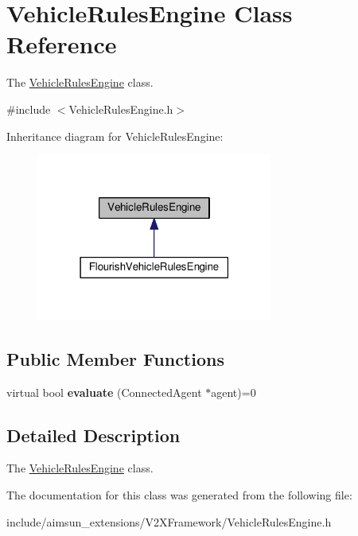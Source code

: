 \hypertarget{classVehicleRulesEngine}{}\section{Vehicle\+Rules\+Engine Class Reference}
\label{classVehicleRulesEngine}


The \hyperlink{classVehicleRulesEngine}{Vehicle\+Rules\+Engine} class.  




{\ttfamily \#include $<$Vehicle\+Rules\+Engine.\+h$>$}



Inheritance diagram for Vehicle\+Rules\+Engine\+:\nopagebreak
\begin{figure}[H]
\begin{center}
\leavevmode
\includegraphics[width=219pt]{classVehicleRulesEngine__inherit__graph}
\end{center}
\end{figure}
\subsection*{Public Member Functions}
\begin{DoxyCompactItemize}
\item 
virtual bool {\bfseries evaluate} (Connected\+Agent $\ast$agent)=0\hypertarget{classVehicleRulesEngine_a3765c1471b409a584ca369de5bda9345}{}\label{classVehicleRulesEngine_a3765c1471b409a584ca369de5bda9345}

\end{DoxyCompactItemize}


\subsection{Detailed Description}
The \hyperlink{classVehicleRulesEngine}{Vehicle\+Rules\+Engine} class. 

The documentation for this class was generated from the following file\+:\begin{DoxyCompactItemize}
\item 
include/aimsun\+\_\+extensions/\+V2\+X\+Framework/Vehicle\+Rules\+Engine.\+h\end{DoxyCompactItemize}
